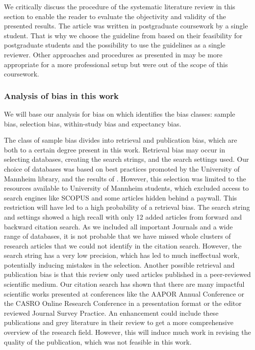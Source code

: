 We critically discuss the procedure of the systematic literature review in this section to enable the reader to evaluate the objectivity and validity of the presented results. The article was written in postgraduate coursework by a single student. That is why we choose the guideline from \cite{weidt_systematic_2016} based on their feasibility for postgraduate students and the possibility to use the guidelines as a single reviewer. Other approaches and procedures as presented in \cite{xiao_guidance_2017,petticrew_systematic_2008,snyder_literature_2019,denyer_producing_2009} may be more appropriate for a more professional setup but were out of the scope of this coursework. 


\subsubsection{Analysis of bias in this work}

We will base our analysis for bias on \cite{durach_new_2017} which identifies the bias classes: sample bias, selection bias, within-study bias and expectancy bias.

The class of sample bias divides into retrieval and publication bias, which are both to a certain degree present in this work. Retrieval bias may occur in selecting databases, creating the search strings, and the search settings used. Our choice of databases was based on best practices promoted by the University of Mannheim library, and the results of \cite{pascoe_systematic_2021, papaioannou_literature_2010, gusenbauer_which_2020}. However, this selection was limited to the resources available to University of Mannheim students, which excluded access to search engines like SCOPUS and some articles hidden behind a paywall. This restriction will have led to a high probability of a retrieval bias. The search string and settings showed a high recall with only 12 added articles from forward and backward citation search. As we included all important Journals and a wide range of databases, it is not probable that we have missed whole clusters of research articles that we could not identify in the citation search. However, the search string has a very low precision, which has led to much ineffectual work, potentially inducing mistakes in the selection. Another possible retrieval and publication bias is that this review only used articles published in a peer-reviewed scientific medium. Our citation search has shown that there are many impactful scientific works presented at conferences like the AAPOR Annual Conference or the CASRO Online Research Conference in a presentation format or the editor reviewed Journal Survey Practice. An enhancement could include these publications and grey literature in their review to get a more comprehensive overview of the research field. However, this will induce much work in revising the quality of the publication, which was not feasible in this work.

